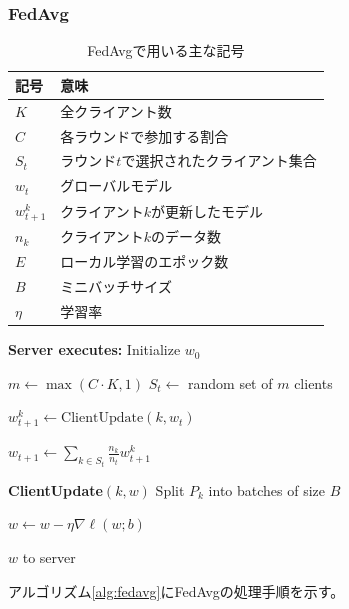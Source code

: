 \documentclass[a4j, twocolumn, dvipdfmx]{jsarticle}  %
\begin{document}
\subsubsection{FedAvg}
\begin{table}[t]
\centering
\caption{FedAvgで用いる主な記号}
\begin{tabular}{ll}
\hline
記号 & 意味 \\
\hline
$K$ & 全クライアント数 \\
$C$ & 各ラウンドで参加する割合 \\
$S_t$ & ラウンド$t$で選択されたクライアント集合 \\
$w_t$ & グローバルモデル \\
$w_{t+1}^k$ & クライアント$k$が更新したモデル \\
$n_k$ & クライアント$k$のデータ数 \\
$E$ & ローカル学習のエポック数 \\
$B$ & ミニバッチサイズ \\
$\eta$ & 学習率 \\
\hline
\end{tabular}
\label{tab:fedavg_symbol}
\end{table}
\begin{algorithm}[t]
\caption{Federated Averaging (FedAvg)}
\label{alg:fedavg}
\begin{algorithmic}[1]

\State \textbf{Server executes:}
\State Initialize $w_0$

    \State $m \leftarrow \max(C \cdot K, 1)$
    \State $S_t \leftarrow$ random set of $m$ clients

        \State $w_{t+1}^{k} \leftarrow \mathrm{ClientUpdate}(k,w_t)$
    \EndFor

    \State $
    w_{t+1}
    \leftarrow
    \sum_{k \in S_t}
    \frac{n_k}{n_t}
    w_{t+1}^{k}
    $
\EndFor

\Statex
\State \textbf{ClientUpdate}$(k,w)$
\State Split $P_k$ into batches of size $B$

        \State $
        w \leftarrow
        w-\eta\nabla\ell(w;b)
        $
    \EndFor
\EndFor

\State \Return $w$ to server

\end{algorithmic}
\end{algorithm}
アルゴリズム\ref{alg:fedavg}にFedAvgの処理手順を示す。
\end{document}
